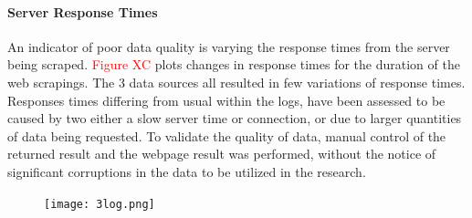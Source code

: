 \documentclass[12pt,a4paper]{article}
\begin{document}
\paragraph{Server Response Times\newline}
An indicator of poor data quality is varying the response times from the server being scraped. \textcolor{red}{Figure XC} plots changes in response times for the duration of the web scrapings. The 3 data sources all resulted in few variations of response times.  Responses times differing from usual within the logs, have been assessed to be caused by two either a slow server time or connection, or due to larger quantities of data being requested. To validate the quality of data, manual control of the returned result and the webpage result was performed, without the notice of significant corruptions in the data to be utilized in the research.
\begin{figure}[H]
  \centering
   \caption{}
   \texttt{[image: 3log.png]} 
  \label{fig:}
\end{figure}
\end{document}
